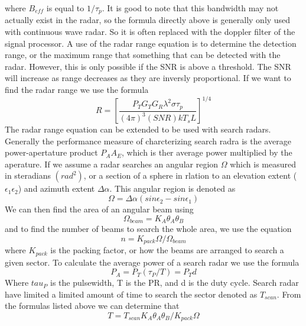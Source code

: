 \documentclass[12pt]{article}
\begin{document}
where $B_{eff}$ is equal to $1 / \tau_p$. It is good to note that this bandwidth may not actually exist in the radar, so the formula directly above is generally only used with continuous wave radar. So it is often replaced with the doppler filter of the signal processor.
A use of the radar range equation is to determine the detection range, or the maximum range that something that can be detected with the radar. However, this is only possible if the SNR is above a threshold. The SNR will increase as range decreases as they are inversly proportional. If we want to find the radar range we use the formula 
\begin{equation}
    R = \left[ \frac{P_T G_T G_R \lambda^2 \sigma \tau_p}{(4 \pi)^3 (SNR) k T_s L} \right]^{1/4}
\end{equation}
The radar range equation can be extended to be used with search radars. Generally the performance measure of charcterizing search radra is the average power-apertature product $P_A A_E$, which is ther average power multiplied by the aperature. If we assume a radar searches an angular region $\Omega$ which is measured in steradians $({rad}^2)$, or a section of a sphere in rlation to an elevation extent ($\epsilon_1 \epsilon_2$) and azimuth extent $\Delta \alpha$. This angular region is denoted as 
\begin{equation}
    \Omega = \Delta \alpha(sin \epsilon_2 - sin \epsilon_1)
\end{equation}
We can then find the area of an angular beam using 
\begin{equation}
    \Omega_{beam} = K_A \theta_A \theta_B
\end{equation}
and to find the number of beams to search the whole area, we use the equation
\begin{equation}
    n = K_{pack}\Omega / \Omega_{beam}
\end{equation}
where $K_{pack}$ is the packing factor, or how the beams are arranged to search a given sector. To calculate the average power of a search radar we use the formula
\begin{equation}
    P_A = P_T (\tau_P / T) = P_T d
\end{equation}
Where $tau_P$ is the pulsewidth, T is the PR, and d is the duty cycle. Search radar have limited a limited amount of time to search the sector denoted as $T_{scan}$. From the formulas listed above we can determine that 
\begin{equation}
    T = T_{scan} K_A \theta_A \theta_B / K_{pack} \Omega 
\end{equation}
\end{document}
